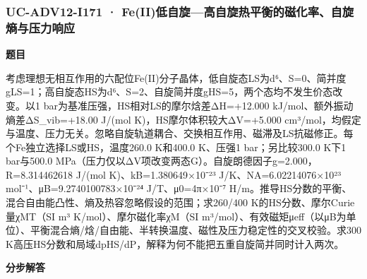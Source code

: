 \documentclass[UTF8,11pt,a4paper]{ctexart}
\begin{document}
\subsubsection*{UC-ADV12-I171 · Fe(II)低自旋—高自旋热平衡的磁化率、自旋熵与压力响应}
\noindent\textbf{题目}\par
考虑理想无相互作用的六配位Fe(II)分子晶体，低自旋态LS为d⁶、S=0、简并度gLS=1；高自旋态HS为d⁶、S=2、自旋简并度gHS=5，两个态均不发生价态改变。以1 bar为基准压强，HS相对LS的摩尔焓差ΔH=+12.000 kJ/mol、额外振动熵差ΔS\_vib=+18.00 J/(mol K)，HS摩尔体积较大ΔV=+5.000 cm³/mol，均假定与温度、压力无关。忽略自旋轨道耦合、交换相互作用、磁滞及LS抗磁修正。每个Fe独立选择LS或HS，温度260.0 K和400.0 K、压强1 bar；另比较300.0 K下1 bar与500.0 MPa（压力仅以ΔV项改变两态G）。自旋朗德因子g=2.000，R=8.314462618 J/(mol K)、kB=1.380649×10⁻²³ J/K、NA=6.02214076×10²³ mol⁻¹、μB=9.2740100783×10⁻²⁴ J/T、μ0=4π×10⁻⁷ H/m。推导HS分数的平衡、混合自由能凸性、熵及热容忽略假设的范围；求260/400 K的HS分数、摩尔Curie量χMT（SI m³ K/mol）、摩尔磁化率χM（SI m³/mol）、有效磁矩μeff（以μB为单位）、平衡混合熵/焓/自由能、半转换温度、磁性及压力稳定性的交叉校验。求300 K高压HS分数和局域dpHS/dP，解释为何不能把五重自旋简并同时计入两次。\par
\medskip\noindent\textbf{分步解答}
\end{document}
